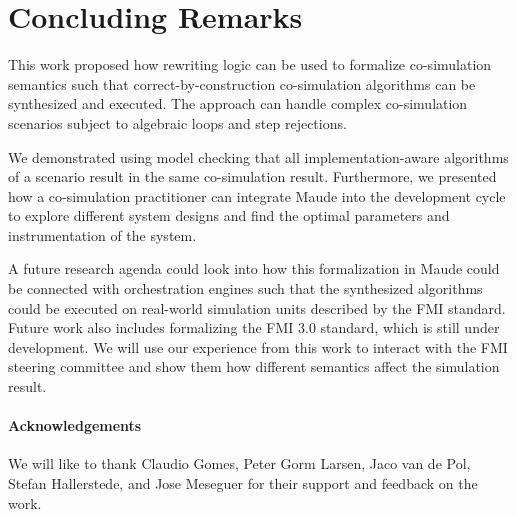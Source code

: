 \section{Concluding Remarks}\label{sc:summary}
This work proposed how rewriting logic can be used to formalize co-simulation semantics such that correct-by-construction co-simulation algorithms can be synthesized and executed.
The approach can handle complex co-simulation scenarios subject to algebraic loops and step rejections.

We demonstrated using model checking that all implementation-aware algorithms of a scenario result in the same co-simulation result.
Furthermore, we presented how a co-simulation practitioner can integrate Maude into the development cycle to explore different system designs and find the optimal parameters and instrumentation of the system.

A future research agenda could look into how this formalization in Maude could be connected with orchestration engines such that the synthesized algorithms could be executed on real-world simulation units described by the FMI standard.
Future work also includes formalizing the FMI 3.0 standard, which is still under development.
We will use our experience from this work to interact with the FMI steering committee and show them how different semantics affect the simulation result.

\paragraph{Acknowledgements}
We will like to thank Claudio Gomes, Peter Gorm Larsen, Jaco van de Pol, Stefan Hallerstede, and Jose Meseguer for their support and feedback on the work.